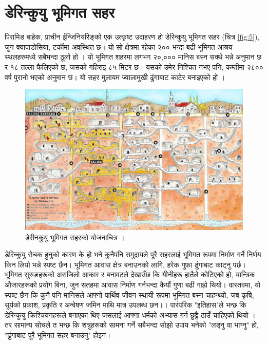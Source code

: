 \documentclass[10pt,twocolumn,letterpaper]{article}
\begin{document}
\section{डेरिन्कुयु भूमिगत सहर}

पिरामिड बाहेक, प्राचीन ईन्जिनियरिङ्को एक उत्कृष्ट उदाहरण हो डेरिन्कुयु भूमिगत सहर (चित्र \ref{fig:5}), जुन क्यापाडोसिया, टर्कीमा अवस्थित छ। यो सो क्षेत्रमा रहेका २०० भन्दा बढी भूमिगत आश्रय स्थलहरुमध्ये सबैभन्दा ठूलो हो \cite{54}। यो भूमिगत शहरमा लगभग २०,००० मानिस बस्न सक्थे भन्ने अनुमान छ र १८ तल्ला फैलिएको छ, जसको गहिराइ ८५ मिटर छ। यसको उमेर निश्चित नभए पनि, कम्तीमा २८०० वर्ष पुरानो भएको अनुमान छ। यो सहर मुलायम ज्वालामुखी ढुंगाबाट काटेर बनाइएको हो \cite{52, 53}।

\begin{figure}[b]
\begin{center}

\includegraphics[width=1\linewidth]{derinkuyu.jpeg}
\end{center}
   \caption{डेरीनकुयु भूमिगत सहरको योजनाचित्र \cite{56}।}
\label{fig:5}
\label{fig:onecol}
\end{figure}

डेरिन्कुयु रोचक हुनुको कारण के हो भने कुनैपनि समुदायले पूरै सहरलाई भूमिगत रूपमा निर्माण गर्ने निर्णय किन लियो भन्ने स्पष्ट छैन। भूमिगत आवास क्षेत्र बनाउनको लागि, हरेक गुफा ढुंगाबाट काट्नु पर्छ। भूमिगत सुरुङहरूको असजिलो आकार र बनावटले देखाउँछ कि यीनीहरू हातैले कोटिएको हो, यान्त्रिक  औजारहरूको प्रयोग बिना, जुन सतहमा आवास निर्माण गर्नभन्दा कैयौं गुणा बढी गाह्रो थियो। वास्तवमा, यो स्पष्ट छैन कि कुनै पनि मानिसले आफ्नो पार्थिव जीवन स्थायी रूपमा भूमिगत बस्न  चाहन्थ्यो, जब कृषि, सूर्यको प्रकाश, प्रकृति र अन्वेषण जमिन माथि मात्र उपलब्ध छन।। पारंपरिक "इतिहास"ले भन्छ कि डेरिन्कुयु क्रिश्चियनहरूले बनाएका थिए जसलाई आफ्ना धर्मको अभ्यास गर्न छुट्टै ठाउँ चाहिएको थियो \cite{53}। तर सामान्य सोचले त भन्छ कि शत्रुहरूको सामना गर्ने सबैभन्दा सोझो उपाय भनेको "लड्नु वा भाग्नु" हो, "ढुंगाबाट पूरै भूमिगत सहर बनाउनु" होइन।
\end{document}

